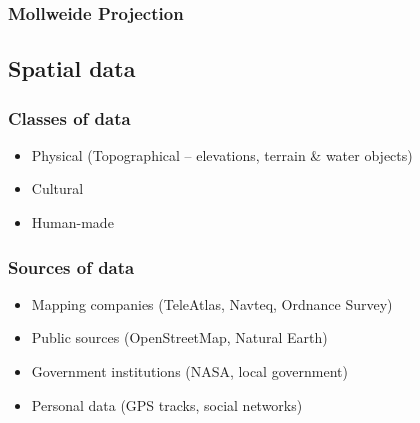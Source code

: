 \documentclass[17pt]{beamer}
\begin{document}
\begin{frame}
  \frametitle{Mollweide Projection}
\end{frame}

\subsection{Spatial data}


\begin{frame}
  \frametitle{Classes of data}
  \begin{itemize}
  \item Physical (Topographical -- elevations, terrain \& water objects)
  \item Cultural
  \item Human-made
  \end{itemize}
\end{frame}

\begin{frame}
  \frametitle{Sources of data}
  \begin{itemize}
  \item Mapping companies (TeleAtlas, Navteq, Ordnance Survey)
  \item Public sources (OpenStreetMap, Natural Earth)
  \item Government institutions (NASA, local government)
  \item Personal data (GPS tracks, social networks)
  \end{itemize}
\end{frame}
\end{document}
